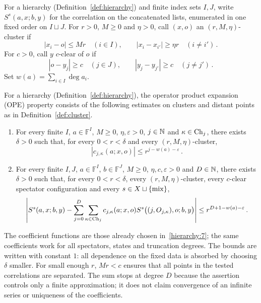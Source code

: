 \begin{definition}\label{def:cluster}
For a hierarchy (Definition~\ref{def:hierarchy}) and finite index sets $I,J$, write $S^s(a,x;b,y)$ for the correlation on the concatenated lists, enumerated in one fixed order on $I\sqcup J$.
For $r>0$, $M\ge0$ and $\eta>0$, call $(x,o)$ an $(r,M,\eta)$-cluster if
\begin{equation}\label{eq:cluster}
|x_i-o|\le Mr\quad(i\in I),
\qquad |x_i-x_{i'}|\ge\eta r\quad(i\ne i')\,.
\end{equation}
For $c>0$, call $y$ $c$-clear of $o$ if
\begin{equation}\label{eq:clear}
|o-y_j|\ge c\quad(j\in J),
\qquad |y_j-y_{j'}|\ge c\quad(j\ne j')\,.
\end{equation}
Set $w(a)=\sum_{i\in I}\deg a_i$.
\end{definition}

\begin{definition}\label{def:ope}
For a hierarchy (Definition~\ref{def:hierarchy}), the operator product expansion (OPE) property consists of the following estimates on clusters and distant points as in Definition~\ref{def:cluster}.
\begin{enumerate}[label=\textup{O\arabic*.},ref=O\arabic*]
\item\label{ope:1} For every finite $I$, $a\in\mathbb F^I$, $M\ge0$, $\eta,\varepsilon>0$, $j\in\mathbb N$ and $\kappa\in\operatorname{Ch}_{j}$, there exists $\delta>0$ such that, for every $0<r<\delta$ and every $(r,M,\eta)$-cluster,
\begin{equation}\label{eq:ope-coefficient}
|c_{j,\kappa}(a;x,o)|\le r^{j-w(a)-\varepsilon}\,.
\end{equation}
\item\label{ope:2} For every finite $I,J$, $a\in\mathbb F^I$, $b\in\mathbb F^J$, $M\ge0$, $\eta,c,\varepsilon>0$ and $D\in\mathbb N$, there exists $\delta>0$ such that, for every $0<r<\delta$, every $(r,M,\eta)$-cluster, every $c$-clear spectator configuration and every $s\in X\sqcup\{\mathrm{mix}\}$,
\begin{equation}\label{eq:ope-remainder}
\left|S^s(a,x;b,y)-\sum_{j=0}^D\sum_{\kappa\in\operatorname{Ch}_{j}}
 c_{j,\kappa}(a;x,o)S^s\bigl((j,O_{j,\kappa}),o;b,y\bigr)\right|\le r^{D+1-w(a)-\varepsilon}\,.
\end{equation}
\end{enumerate}
\end{definition}

The coefficient functions are those already chosen in~\ref{hierarchy:7}; the same coefficients work for all spectators, states and truncation degrees.
The bounds are written with constant $1$: all dependence on the fixed data is absorbed by choosing $\delta$ smaller.
For small enough $r$, $Mr<c$ ensures that all points in the tested correlations are separated.
The sum stops at degree $D$ because the assertion controls only a finite approximation; it does not claim convergence of an infinite series or uniqueness of the coefficients.

